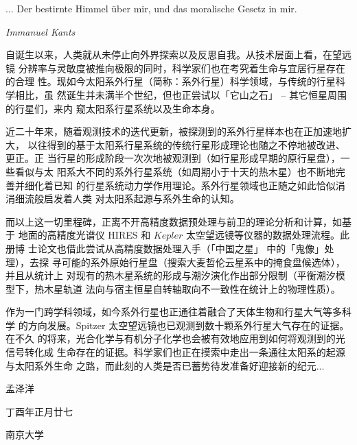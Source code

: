 \begin{preface} 

\epigraph{... Der bestirnte Himmel über mir, und das moralische Gesetz in mir.}{\textit{Immanuel Kants}}

\vspace{1cm}

自诞生以来，人类就从未停止向外界探索以及反思自我。从技术层面上看，在望远镜
分辨率与灵敏度被推向极限的同时，科学家们也在考究着生命与宜居行星存在的合理
性。现如今太阳系外行星（简称：系外行星）科学领域，与传统的行星科学相比，虽
然诞生并未满半个世纪，但也正尝试以「它山之石」 -- 其它恒星周围的行星们，来内
窥太阳系行星系统以及生命本身。
\\ \par
近二十年来，随着观测技术的迭代更新，被探测到的系外行星样本也在正加速地扩大，
以往得到的基于太阳系行星系统的传统行星形成理论也随之不停地被改进、更正。正
当行星的形成阶段一次次地被观测到（如行星形成早期的原行星盘），一些看似与太
阳系大不同的系外行星系统（如周期小于十天的热木星）也不断地完善并细化着已知
的行星系统动力学作用理论。系外行星领域也正随之如此恰似涓涓细流般启发着人类
对太阳系起源与系外生命的认知。
\\ \par
而以上这一切里程碑，正离不开高精度数据预处理与前卫的理论分析和计算，如基于
地面的高精度光谱仪 HIRES 和 $Kepler$ 太空望远镜等仪器的数据处理流程。此册博
士论文也借此尝试从高精度数据处理入手（「中国之星」 中的「鬼像」处理），去探
寻可能的系外原始行星盘（搜索大麦哲伦云星系中的掩食盘候选体），并且从统计上
对现有的热木星系统的形成与潮汐演化作出部分限制（平衡潮汐模型下，热木星轨道
法向与宿主恒星自转轴取向不一致性在统计上的物理性质）。
\\ \par
作为一门跨学科领域，如今系外行星也正通往着融合了天体生物和行星大气等多科学
的方向发展。Spitzer 太空望远镜也已观测到数十颗系外行星大气存在的证据。在不久
的将来，光合化学与有机分子化学也会被有效地应用到如何将观测到的光信号转化成
生命存在的证据。科学家们也正在摸索中走出一条通往太阳系的起源与太阳系外生命
之路，而此刻的人类是否已蓄势待发准备好迎接新的纪元...


\vfill

\hfill 孟泽洋

\hfill 丁酉年正月廿七

\hfill 南京大学

\end{preface}
